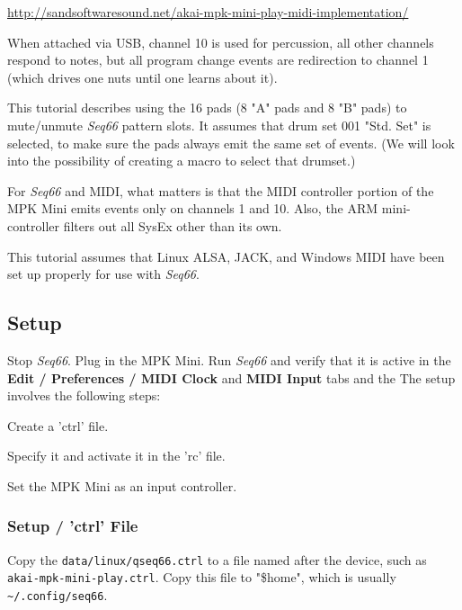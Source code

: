 \documentclass[
 11pt,
 twoside,
 a4paper,
 final                                 %
]{article}
\begin{document}
   \url{http://sandsoftwaresound.net/akai-mpk-mini-play-midi-implementation/}

   When attached via USB, channel 10 is used for percussion, all other
   channels respond to notes, but all program change events are
   redirection to channel 1 (which drives one nuts until one learns
   about it).

   This tutorial describes using the 16 pads (8 "A" pads and 8 "B" pads)
   to mute/unmute \textsl{Seq66} pattern slots.
   It assumes that drum set 001 "Std. Set" is selected, to make sure
   the pads always emit the same set of events.
   (We will look into the possibility of creating a macro to select
   that drumset.)

   For \textsl{Seq66} and MIDI, what matters is that the MIDI
   controller portion of the MPK Mini emits events only on channels 1 and 10.
   Also, the ARM mini-controller filters out all SysEx other than
   its own.

   This tutorial assumes that Linux ALSA, JACK, and Windows MIDI
   have been set up properly for use with \textsl{Seq66}.

\subsection{Setup}
\label{subsec:setup}

   Stop \textsl{Seq66}.
   Plug in the MPK Mini.
   Run \textsl{Seq66} and verify that it is active
   in the 
   \textbf{Edit / Preferences / MIDI Clock} and
   \textbf{MIDI Input} tabs and the
   The setup involves the following steps:

   \begin{enumber}
      \item Create a 'ctrl' file.
      \item Specify it and activate it in the 'rc' file.
      \item Set the MPK Mini as an input controller.
   \end{enumber}

\subsubsection{Setup / 'ctrl' File}
\label{subsubsec:setup_ctrl_file}

   Copy the \texttt{data/linux/qseq66.ctrl} to a file named after
   the device, such as \texttt{akai-mpk-mini-play.ctrl}. Copy this file
   to "\$home", which is usually \texttt{\textasciitilde/.config/seq66}.
\end{document}
